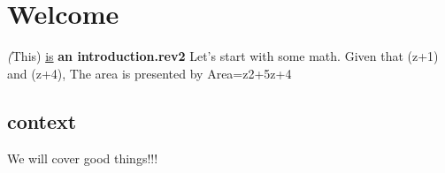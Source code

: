 \documentclass[11pt]{article}
\begin{document}
\section {Welcome}
\textit(This) \underline{is} \textbf{an introduction.rev2}
Let's start with some math. Given that (z+1) and (z+4),
The area is presented by Area=z2+5z+4
\subsection[10]{context} We will cover good things!!!
\end{document}
